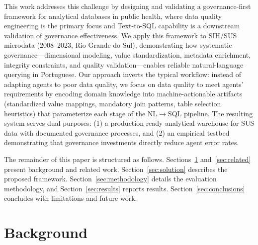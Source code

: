\documentclass[sigconf,natbib=false]{acmart}
\begin{document}
This work addresses this challenge by designing and validating a governance-first framework for analytical databases in public health, where data quality engineering is the primary focus and Text-to-SQL capability is a downstream validation of governance effectiveness. We apply this framework to SIH/SUS microdata (2008–2023, Rio Grande do Sul), demonstrating how systematic governance—dimensional modeling, value standardization, metadata enrichment, integrity constraints, and quality validation—enables reliable natural-language querying in Portuguese. Our approach inverts the typical workflow: instead of adapting agents to poor data quality, we focus on data quality to meet agents' requirements by encoding domain knowledge into machine-actionable artifacts (standardized value mappings, mandatory join patterns, table selection heuristics) that parameterize each stage of the NL$\rightarrow$SQL pipeline. The resulting system serves dual purposes: (1) a production-ready analytical warehouse for SUS data with documented governance processes, and (2) an empirical testbed demonstrating that governance investments directly reduce agent error rates.


The remainder of this paper is structured as follows. Sections~\ref{sec:back} and~\ref{sec:related} present background and related work. Section~\ref{sec:solution} describes the proposed framework. Section~\ref{sec:methodology} details the evaluation methodology, and Section~\ref{sec:results} reports results. Section~\ref{sec:conclusions} concludes with limitations and future work.


\section{Background}
\label{sec:back}
\end{document}
